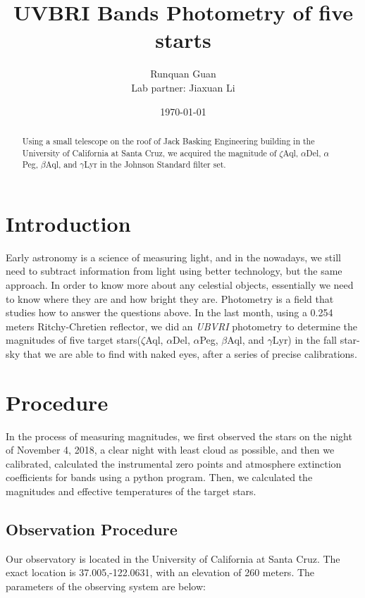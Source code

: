 \documentclass[]{article}
\begin{document}
\title{UVBRI Bands Photometry of five starts}

\author{Runquan Guan \\
Lab partner: Jiaxuan Li}

\date{\today}

\maketitle

\begin{abstract}

Using a small telescope on the roof of Jack Basking Engineering building in the University of California at Santa Cruz, we acquired the magnitude of $\zeta$Aql, $\alpha$Del, $\alpha$Peg, $\beta$Aql, and $\gamma$Lyr in the Johnson Standard filter set.  

\end{abstract} 

\section*{Introduction}

Early astronomy is a science of measuring light, and in the nowadays, we still need to subtract information from light using better technology, but the same approach. In order to know more about any celestial objects, essentially we need to know where they are and how bright they are. Photometry is a field that studies how to answer the questions above. In the last month, using a 0.254 meters Ritchy-Chretien reflector, we did an \textit{UBVRI} photometry to determine the magnitudes of five target stars($\zeta$Aql, $\alpha$Del, $\alpha$Peg, $\beta$Aql, and $\gamma$Lyr) in the fall star-sky that we are able to find with naked eyes, after a series of precise calibrations. 


\section*{Procedure}
In the process of measuring magnitudes, we first observed the stars on the night of November 4, 2018, a clear night with least cloud as possible, and then we calibrated, calculated the instrumental zero points and atmosphere extinction coefficients for  bands using a python program. Then, we calculated the magnitudes and effective temperatures of the target stars. 


\subsection*{Observation Procedure}
Our observatory is located in the University of California at Santa Cruz. The exact location is 37.005,-122.0631, with an elevation of 260 meters. The parameters of the observing system are below\cite{Obs}: 
\end{document}

